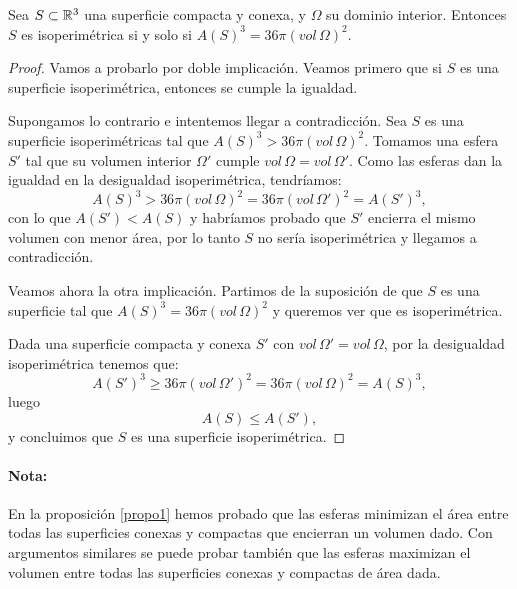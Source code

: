 \begin{corolario}\label{cor2}
Sea $S \subset \mathbb{R}^3$ una superficie compacta y conexa, y $\Omega$ su dominio interior. Entonces $S$ es isoperimétrica si y solo si $A(S)^3 = 36\pi (vol \, \Omega)^2$.
\end{corolario}
\begin{proof}
Vamos a probarlo por doble implicación. Veamos primero que si $S$ es una superficie isoperimétrica, entonces se cumple la igualdad.

Supongamos lo contrario e intentemos llegar a contradicción. Sea $S$ es una superficie isoperimétricas tal que $A(S)^3 > 36\pi (vol \, \Omega)^2$. Tomamos una esfera $S'$ tal que su volumen interior $\Omega'$ cumple $vol \, \Omega = vol \, \Omega'$. Como las esferas dan la igualdad en la desigualdad isoperimétrica, tendríamos:
%
\begin{equation*}
    A(S)^3 > 36\pi (vol \, \Omega)^2 = 36\pi (vol \, \Omega')^2 = A(S')^3,
\end{equation*}
%
con lo que $A(S') < A(S)$ y habríamos probado que $S'$ encierra el mismo volumen con menor área, por lo tanto $S$ no sería isoperimétrica y llegamos a contradicción.

Veamos ahora la otra implicación. Partimos de la suposición de que $S$ es una superficie tal que $A(S)^3 = 36\pi (vol \, \Omega)^2$ y queremos ver que es isoperimétrica.

Dada una superficie compacta y conexa $S'$ con $vol \, \Omega' = vol \, \Omega$, por la desigualdad isoperimétrica tenemos que:
%
\begin{equation*}
    A(S')^3 \geq 36\pi (vol \, \Omega')^2 = 36\pi(vol \, \Omega)^2 = A(S)^3,
\end{equation*}
%
luego
%
\begin{equation*}
    A(S) \leq A(S'),
\end{equation*}
%
y concluimos que $S$ es una superficie isoperimétrica.
\end{proof}

\paragraph{Nota:} En la proposición \ref{propo1} hemos probado que las esferas minimizan el área entre todas las superficies conexas y compactas que encierran un volumen dado. Con argumentos similares se puede probar también que las esferas maximizan el volumen entre todas las superficies conexas y compactas de área dada.

